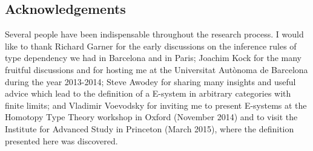 \subsection*{Acknowledgements}
Several people have been indispensable throughout the research process.
I would like to thank 
Richard Garner for the early discussions on the inference rules of type 
dependency we had in Barcelona and in Paris; 
Joachim Kock for the many fruitful discussions and for hosting me at the Universitat
Aut\`onoma de Barcelona during the year 2013-2014;
Steve Awodey for sharing many insights and useful advice which lead to the
definition of a E-system in arbitrary categories with finite limits;
and Vladimir Voevodsky for inviting me to present E-systems at the Homotopy Type
Theory workshop in Oxford (November 2014) and to visit the Institute for Advanced 
Study in Princeton (March 2015), where the definition presented here was
discovered.
